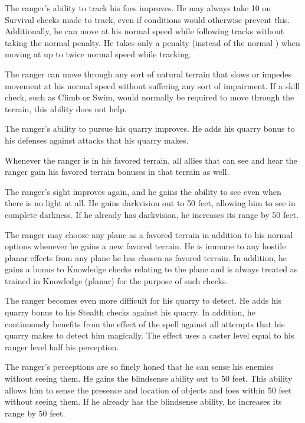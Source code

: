 The ranger's ability to track his foes improves.
He may always take 10 on Survival checks made to track, even if conditions would otherwise prevent this.
Additionally, he can move at his normal speed while following tracks without taking the normal  penalty.
He takes only a  penalty (instead of the normal ) when moving at up to twice normal speed while tracking.

The ranger can move through any sort of natural terrain that slows or impedes movement at his normal speed without suffering any sort of impairment.
If a skill check, such as Climb or Swim, would normally be required to move through the terrain, this ability does not help.

The ranger's ability to pursue his quarry improves.
He adds his quarry bonus to his defenses against attacks that his quarry makes.

Whenever the ranger is in his favored terrain, all allies that can see and hear the ranger gain his favored terrain bonuses in that terrain as well.

The ranger's sight improves again, and he gains the ability to see even when there is no light at all.
He gains darkvision out to 50 feet, allowing him to see in complete darkness.
If he already has darkvision, he increases its range by 50 feet.

The ranger may choose any plane as a favored terrain in addition to his normal options whenever he gains a new favored terrain.
He is immune to any hostile planar effects from any plane he has chosen as favored terrain.
In addition, he gains a  bonus to Knowledge checks relating to the plane and is always treated as trained in Knowledge (planar) for the purpose of such checks.

The ranger becomes even more difficult for his quarry to detect.
He adds his quarry bonus to his Stealth checks against his quarry.
In addition, he continuously benefits from the effect of the  spell against all attempts that his quarry makes to detect him magically.
The effect uses a caster level equal to his ranger level \add half his perception.

The ranger's perceptions are so finely honed that he can sense his enemies without seeing them.
He gains the blindsense ability out to 50 feet.
This ability allows him to sense the presence and location of objects and foes within 50 feet without seeing them.
If he already has the blindsense ability, he increases its range by 50 feet.

